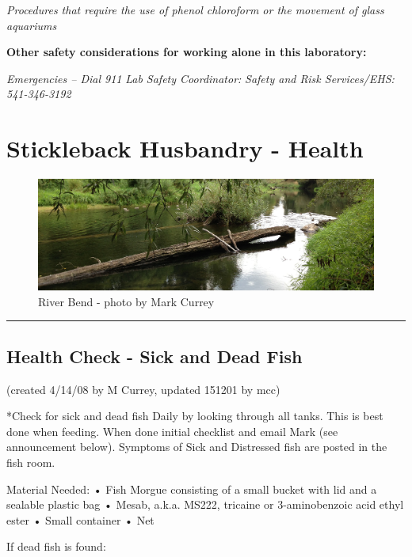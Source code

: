 \documentclass[
]{book}
\begin{document}
\emph{Procedures that require the use of phenol chloroform or the movement of glass aquariums}

\textbf{Other safety considerations for working alone in this laboratory:}

\emph{Emergencies -- Dial 911}
\emph{Lab Safety Coordinator:}
\emph{Safety and Risk Services/EHS: 541-346-3192}

\hypertarget{stickleback-husbandry---health}{%
\chapter{Stickleback Husbandry - Health}\label{stickleback-husbandry---health}}

\begin{figure}
\centering
\includegraphics{images/riverbend_header.jpg}
\caption{River Bend - photo by Mark Currey}
\end{figure}

\begin{center}\rule{0.5\linewidth}{0.5pt}\end{center}

\hypertarget{health-check---sick-and-dead-fish}{%
\section{Health Check - Sick and Dead Fish}\label{health-check---sick-and-dead-fish}}

(created 4/14/08 by M Currey, updated 151201 by mcc)

*Check for sick and dead fish Daily by looking through all tanks. This is best done when feeding. When done initial checklist and email Mark (see announcement below). Symptoms of Sick and Distressed fish are posted in the fish room.

Material Needed:
• Fish Morgue consisting of a small bucket with lid and a sealable plastic bag
• Mesab, a.k.a. MS222, tricaine or 3-aminobenzoic acid ethyl ester
• Small container
• Net

If dead fish is found:
\end{document}
